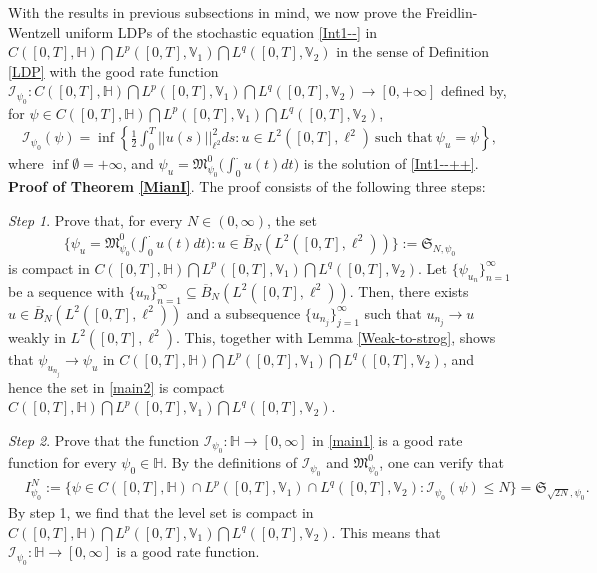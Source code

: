 \documentclass[11pt]{article}
\renewcommand{\leq}{\leqslant}
\numberwithin{equation}{section}
\begin{document}
With the results in previous subsections in mind, we now prove the Freidlin-Wentzell uniform
LDPs of  the stochastic equation
\eqref{Int1--} in
$C([0,T],\mathbb{H} )\bigcap L^p([0,T], \mathbb{V}_1  )\bigcap L^q([0,T], \mathbb{V}_2)$
in the sense of Definition \ref{LDP} with
the good rate function $\mathcal{I}_{\psi_0}:C([0,T],\mathbb{H} )\bigcap L^p([0,T], \mathbb{V}_1  )\bigcap L^q([0,T], \mathbb{V}_2)
\rightarrow[0,+\infty]$ defined by, for $\psi\in C([0,T],\mathbb{H} )\bigcap L^p([0,T], \mathbb{V}_1  )\bigcap L^q([0,T], \mathbb{V}_2)$,
\begin{align}
\label{main1}
\mathcal{I}_{\psi_0}(\psi)=\inf\left\{\frac{1}{2}
\int_{0}^{T}||u(s)||_{\ell^{2}}^{2}ds:
u\in L^{2}([0,T],\ell^{2})~
\text{such~that}~ \psi_u=\psi\right\},
\end{align}
where $\inf\emptyset=+\infty$, and
$\psi_u=
\mathfrak{M}_{\psi_0}^0
\big(
\int_0^\cdot u(t)dt\big)$ is the solution of \eqref{Int1--++}.
\\





\textbf{Proof of Theorem \ref{MianI}}.
  The proof
consists of  the following  three steps:

\emph{Step 1}. Prove that, for every $N\in(0,\infty)$, the set
\begin{align}
\label{main2}\bigg\{\psi_u=
\mathfrak{M}_{\psi_0}^0
\bigg(
\int_0^\cdot u(t)dt\bigg):u\in \overline{B}_N(L^2([0,T],\ell^2 ))\bigg\}:=\mathfrak{S}_{N,\psi_0}
\end{align}
is compact in $C([0,T],\mathbb{H} )\bigcap
L^p([0,T], \mathbb{V}_1  ) \bigcap L^q([0,T], \mathbb{V}_2)$. Let $\{\psi_{u_{n}}\}_{n=1}^{\infty}$ be a sequence   with $\{u_{n}\}_{n=1}^{\infty}\subseteq \overline{B}_N(L^2([0,T],\ell^2 ))$. Then, there exists $u\in \overline{B}_N(L^2([0,T],\ell^2 ))$ and a subsequence $\{u_{n_{j}}\}_{j=1}^{\infty}$ such that $u_{n_{j}}\to u$ weakly in $L^{2}([0,T],\ell^2)$. This, together with
Lemma \ref{Weak-to-strog}, shows that $\psi_{u_{n_{j}}}\to \psi_{u}$ in $C([0,T],\mathbb{H} )\bigcap
L^p([0,T], \mathbb{V}_1  ) \bigcap L^q([0,T], \mathbb{V}_2)$, and hence the set in \eqref{main2} is compact $C([0,T],\mathbb{H} )\bigcap
L^p([0,T], \mathbb{V}_1  ) \bigcap L^q([0,T], \mathbb{V}_2)$.

\emph{Step 2}. Prove that the function $\mathcal{I}_{\psi_0}:\mathbb{H}
\rightarrow[0,\infty]$ in \eqref{main1} is a good rate function for every $\psi_0\in \mathbb{H}$.
By the definitions of $\mathcal{I}_{\psi_0}$
and $\mathfrak{M}_{\psi_0}^0$, one can verify that
\begin{align}
\label{main3}&
I^N_{\psi_0}:=\big\{\psi\in C([0,T],\mathbb{H} )\cap
L^p([0,T], \mathbb{V}_1  ) \cap L^q([0,T], \mathbb{V}_2):
\mathcal{I}_{\psi_0}(\psi)
\leq N\big\}=\mathfrak{S}_{\sqrt{2N},\psi_0}.
\end{align}
By step 1, we find that
the level set is compact in $C([0,T],\mathbb{H} )\bigcap
L^p([0,T], \mathbb{V}_1  ) \bigcap L^q([0,T], \mathbb{V}_2)$. This means that $\mathcal{I}_{\psi_0}:\mathbb{H}
\rightarrow[0,\infty]$ is a good rate function.
\end{document}
